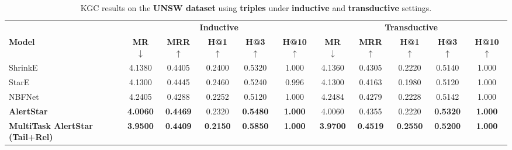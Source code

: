 \documentclass[10pt,journal,compsoc]{IEEEtran}
\begin{document}
\begin{table}[t]
\tiny
\centering
\caption{KGC results on the \textbf{UNSW dataset} 
         using \textbf{triples} under \textbf{inductive} and \textbf{transductive} settings.}
\label{tab:kgc_triples_UNSW}
\begin{tabular}{l ccccc ccccc}
\toprule
 & \multicolumn{5}{c}{\textbf{Inductive}} & \multicolumn{5}{c}{\textbf{Transductive}} \\
\cmidrule(lr){2-6} \cmidrule(lr){7-11}
\textbf{Model} & \textbf{MR} $\downarrow$ & \textbf{MRR} $\uparrow$& \textbf{H@1} $\uparrow$& \textbf{H@3} $\uparrow$& \textbf{H@10} $\uparrow$& \textbf{MR} $\downarrow$& \textbf{MRR} $\uparrow$& \textbf{H@1} $\uparrow$& \textbf{H@3} $\uparrow$& \textbf{H@10} $\uparrow$\\
\midrule
ShrinkE         & 4.1380 & 0.4405 & 0.2400 & 0.5320 & 1.000 & 4.1360 & 0.4305 & 0.2220 & 0.5140 & 1.000 \\
StarE           & 4.1300 & 0.4445 & 0.2460 & 0.5240 & 0.996 & 4.1300 & 0.4163 & 0.1980 & 0.5120 & 1.000 \\
NBFNet          & 4.2405 & 0.4288 & 0.2252 & 0.5120 & 1.000 & 4.2484 & 0.4279 & 0.2228 & 0.5142 & 1.000 \\
\midrule
\textbf{AlertStar}       & \textbf{4.0060} & \textbf{0.4469} & 0.2320 & \textbf{0.5480} & \textbf{1.000} & 4.0060 & 0.4355 & 0.2220 & \textbf{0.5320} & \textbf{1.000} \\
\textbf{MultiTask AlertStar (Tail+Rel)} & \textbf{3.9500} & \textbf{0.4409} & \textbf{0.2150} & \textbf{0.5850} & \textbf{1.000} & \textbf{3.9700} & \textbf{0.4519} & \textbf{0.2550} & \textbf{0.5200} & \textbf{1.000} \\

\bottomrule
\end{tabular}
\end{table}
\end{document}

